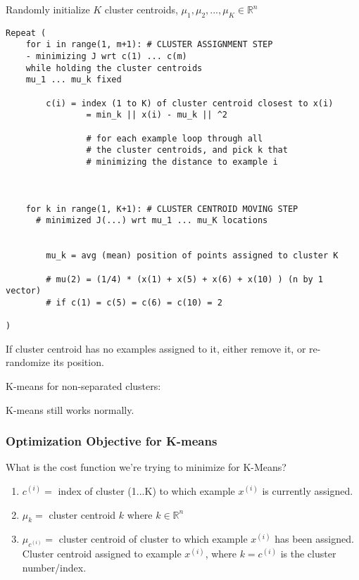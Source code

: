 \documentclass{article}
\begin{document}
\begin{myboxb}
Randomly initialize $K$ cluster centroids, $\mu_1, \mu_2, ... , \mu_K \in \mathbb{R}^n$

\begin{verbatim}
Repeat (
    for i in range(1, m+1): # CLUSTER ASSIGNMENT STEP 
    - minimizing J wrt c(1) ... c(m) 
    while holding the cluster centroids
    mu_1 ... mu_k fixed
    
        c(i) = index (1 to K) of cluster centroid closest to x(i)
                = min_k || x(i) - mu_k || ^2
                
                # for each example loop through all 
                # the cluster centroids, and pick k that 
                # minimizing the distance to example i 
                
                
        
    for k in range(1, K+1): # CLUSTER CENTROID MOVING STEP
      # minimized J(...) wrt mu_1 ... mu_K locations 
    
    
        mu_k = avg (mean) position of points assigned to cluster K
        
        # mu(2) = (1/4) * (x(1) + x(5) + x(6) + x(10) ) (n by 1 vector)
        # if c(1) = c(5) = c(6) = c(10) = 2

)
\end{verbatim}


If cluster centroid has no examples assigned to it, either remove it, or re-randomize its position.



\end{myboxb}



K-means for non-separated clusters:

K-means still works normally.





\subsubsection{Optimization Objective for K-means}

What is the cost function we're trying to minimize for K-Means?


\begin{enumerate}
\item $c^{(i)} =$ index of cluster (1...K) to which example $x^{(i)}$ is currently assigned.

 \item $\mu_k =$ cluster centroid $k$ where $k \in \mathbb{R}^n$

  \item  $\mu_{c^{(i)}} =$ cluster centroid of cluster to which example $x^{(i)}$ has been assigned. Cluster centroid assigned to example $x^{(i)}$, where $k = c^{(i)}$ is the cluster number/index.
\end{enumerate}
\end{document}
